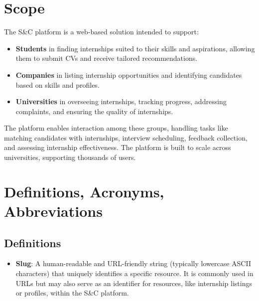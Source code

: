 \section{Scope}


The S\&C platform is a web-based solution intended to support:
\begin{itemize}
    \item \textbf{Students} in finding internships suited to their skills and aspirations, allowing them to submit CVs and receive tailored recommendations.
    \item \textbf{Companies} in listing internship opportunities and identifying candidates based on skills and profiles.
    \item \textbf{Universities} in overseeing internships, tracking progress, addressing complaints, and ensuring the quality of internships.
\end{itemize}
The platform enables interaction among these groups, handling tasks like matching candidates with internships, interview scheduling, feedback collection, and assessing internship effectiveness. The platform is built to scale across universities, supporting thousands of users.

\section{Definitions, Acronyms, Abbreviations}

\subsection{Definitions}
\begin{itemize}
    \item \textbf{Slug}: A human-readable and URL-friendly string (typically lowercase ASCII characters) that uniquely identifies a specific resource. It is commonly used in URLs but may also serve as an identifier for resources, like internship listings or profiles, within the S\&C platform.
\end{itemize}

